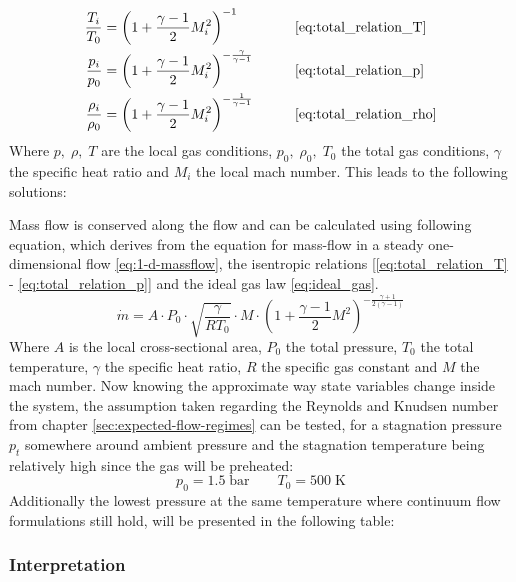 	\begin{alignat*}{2}
	    \frac{T_i}{T_0}   & = \left( 1 + \frac{\gamma - 1}{2} M_i^2 \right)^{-1}
	    & \qquad & \eqref{eq:total_relation_T} \\
	    \frac{p_i}{p_0}   & = \left( 1 + \frac{\gamma - 1}{2} M_i^2 \right)^{-\frac{\gamma}{\gamma - 1}}
	    & \qquad & \eqref{eq:total_relation_p} \\
	    \frac{\rho_i}{\rho_0} & = \left( 1 + \frac{\gamma - 1}{2} M_i^2 \right)^{-\frac{1}{\gamma - 1}}
	    & \qquad & \eqref{eq:total_relation_rho}
	\end{alignat*}
	Where $p,\; \rho,\; T$ are the local gas conditions, $p_0,\; \rho_0,\; T_0$ the total gas conditions, $\gamma$ the specific heat ratio and $M_i$ the local mach number.
	This leads to the following solutions:
	
	Mass flow is conserved along the flow and can be calculated using following equation, which derives from the equation for mass-flow in a steady one-dimensional flow \eqref{eq:1-d-massflow}, the isentropic relations [\eqref{eq:total_relation_T} - \eqref{eq:total_relation_p}] and the ideal gas law \eqref{eq:ideal_gas}.
	\cite{benson_mass_nodate}
	$$
		\dot{m} = A \cdot P_0 \cdot \sqrt{\frac{\gamma}{R T_0}} \cdot M \cdot \left(1 + \frac{\gamma - 1}{2} M^2\right)^{-\frac{\gamma + 1}{2(\gamma - 1)}}
	$$
	Where $A$ is the local cross-sectional area, $P_0$ the total pressure, $T_0$ the total temperature, $\gamma$ the specific heat ratio, $R$ the specific gas constant and $M$ the mach number.
	\cite{Cantwell_AA210A}
	Now knowing the approximate way state variables change inside the system, the assumption taken regarding the Reynolds and Knudsen number from chapter \ref{sec:expected-flow-regimes} can be tested, for a stagnation pressure $p_t$ somewhere around ambient pressure and the stagnation temperature being relatively high since the gas will be preheated:
	$$
		p_0 = 1.5\;\text{bar} \qquad T_0 = 500\;\text{K}
	$$
	Additionally the lowest pressure at the same temperature where continuum flow formulations still hold, will be presented in the following table:
	
	

\subsubsection*{Interpretation}
